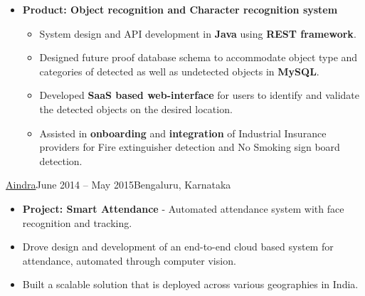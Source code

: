 \documentclass[10pt,a4paper,ragged2e,withhyper]{altacv}
\begin{document}
\begin{paracol}{2}
\begin{itemize}
\begin{itemize}
\end{itemize}


\item[\textbf{2.}] \textbf{Product: Object recognition and Character recognition system}
\begin{itemize}
\item System design and API development in \textbf{Java} using \textbf{REST framework}.
\item Designed future proof database schema to accommodate object type and categories of detected as well as undetected objects in \textbf{MySQL}.
\item Developed \textbf{SaaS based web-interface} for users to identify and validate the detected objects on the desired location.
\item Assisted in \textbf{onboarding} and \textbf{integration} of Industrial Insurance providers for Fire extinguisher detection and No Smoking sign board detection.
\end{itemize}

\end{itemize}


\divider

{\href{https://www.aindra.in/}{Aindra}}{June 2014 – May 2015}{Bengaluru, Karnataka}
\begin{itemize}
\item \textbf{Project: Smart Attendance} - Automated attendance system with face recognition and tracking.
\item Drove design and development of an end-to-end cloud based system for attendance, automated through computer vision.
\item Built a scalable solution that is deployed across various geographies in India.


\end{itemize}
\end{paracol}
\end{document}
